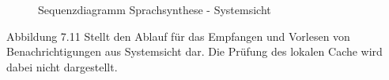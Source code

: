 \begin{figure}[h]
    \centering
    \begin{minipage}[b]{0.9\textwidth}
        \caption{Sequenzdiagramm Sprachsynthese - Systemsicht}
    \end{minipage}
\end{figure}

Abbildung 7.11 Stellt den Ablauf für das Empfangen und Vorlesen von Benachrichtigungen aus Systemsicht dar.
Die Prüfung des lokalen Cache wird dabei nicht dargestellt.

\clearpage
